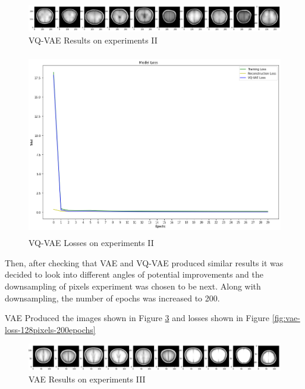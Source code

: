\begin{figure}[ht]
    \centering
    \includegraphics[width = 17cm]{images/vqvae-6layers-30-epochs.png}
    \caption[VQ-VAE Results on experiments II]{VQ-VAE Results on experiments II}
    \label{fig:vqvae-6layers-30-epochs}
\end{figure}

\begin{figure}[ht]
    \centering
    \includegraphics[width = 14cm, height=8cm]{images/vqvae-6layers-loss-30-epochs.png}
    \caption[VQ-VAE Losses on experiments II]{VQ-VAE Losses on experiments II}
    \label{fig:vqvae-6layers-loss-30-epochs}
\end{figure}

Then, after checking that VAE and VQ-VAE produced similar results it was decided to look into different angles of potential improvements and the downsampling of pixels experiment was chosen to be next. Along with downsampling, the number of epochs was increased to 200.

VAE Produced the images shown in Figure \ref*{fig:vae-brains-128pixels-200epochs} and losses shown in Figure \ref*{fig:vae-loss-128pixels-200epochs}

\begin{figure}[ht]
    \centering
    \includegraphics[width = 17cm]{images/vae-brains-128pixels-200epochs.png}
    \caption[VAE Results on experiments III]{VAE Results on experiments III}
    \label{fig:vae-brains-128pixels-200epochs}
\end{figure}

